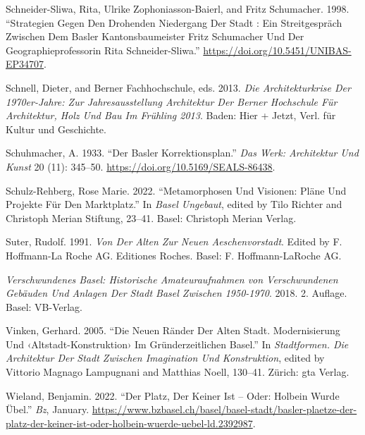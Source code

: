 \documentclass[
  letterpaper,
  DIV=11,
  numbers=noendperiod]{scrartcl}
\newlength{\cslhangindent}
\newenvironment{CSLReferences}[2] %
 {\begin{list}{}{%
  \setlength{\itemindent}{0pt}
  \setlength{\leftmargin}{0pt}
  \setlength{\parsep}{0pt}
  \ifodd #1
   \setlength{\leftmargin}{\cslhangindent}
   \setlength{\itemindent}{-1\cslhangindent}
  \fi
  \setlength{\itemsep}{#2\baselineskip}}}
 {\end{list}}
\begin{document}
\begin{CSLReferences}{1}{0}
Schneider-Sliwa, Rita, Ulrike Zophoniasson-Baierl, and Fritz Schumacher.
1998. {``Strategien Gegen Den Drohenden {Niedergang} Der {Stadt} : Ein
{Streitgespräch} Zwischen Dem {Basler} {Kantonsbaumeister} {Fritz}
{Schumacher} Und Der {Geographieprofessorin} {Rita}
{Schneider}-{Sliwa}.''} \url{https://doi.org/10.5451/UNIBAS-EP34707}.

Schnell, Dieter, and Berner Fachhochschule, eds. 2013. \emph{Die
{Architekturkrise} Der 1970er-{Jahre}: Zur {Jahresausstellung}
{Architektur} Der {Berner} {Hochschule} Für {Architektur}, {Holz} Und
{Bau} Im {Frühling} 2013}. Baden: Hier + Jetzt, Verl. für Kultur und
Geschichte.

Schuhmacher, A. 1933. {``Der {Basler} {Korrektionsplan}.''} \emph{Das
Werk: Architektur Und Kunst} 20 (11): 345--50.
\url{https://doi.org/10.5169/SEALS-86438}.

Schulz-Rehberg, Rose Marie. 2022. {``Metamorphosen Und {Visionen}:
{Pläne} Und {Projekte} Für Den {Marktplatz}.''} In \emph{Basel
Ungebaut}, edited by Tilo Richter and Christoph Merian Stiftung, 23--41.
Basel: Christoph Merian Verlag.

Suter, Rudolf. 1991. \emph{Von Der Alten Zur Neuen {Aeschenvorstadt}}.
Edited by F. Hoffmann-La Roche AG. Editiones {Roches}. Basel: F.
Hoffmann-LaRoche AG.

\emph{Verschwundenes {Basel}: Historische {Amateuraufnahmen} von
Verschwundenen {Gebäuden} Und {Anlagen} Der {Stadt} {Basel} Zwischen
1950-1970}. 2018. 2. Auflage. Basel: VB-Verlag.

Vinken, Gerhard. 2005. {``Die Neuen {Ränder} Der Alten {Stadt}.
{Modernisierung} Und ‹{Altstadt}-{Konstruktion}› Im Gründerzeitlichen
{Basel}.''} In \emph{Stadtformen. {Die} {Architektur} Der {Stadt}
Zwischen {Imagination} Und {Konstruktion}}, edited by Vittorio Magnago
Lampugnani and Matthias Noell, 130--41. Zürich: gta Verlag.

Wieland, Benjamin. 2022. {``Der {Platz}, Der Keiner Ist -- Oder:
{Holbein} Wurde Übel.''} \emph{Bz}, January.
\url{https://www.bzbasel.ch/basel/basel-stadt/basler-plaetze-der-platz-der-keiner-ist-oder-holbein-wuerde-uebel-ld.2392987}.


\end{CSLReferences}
\end{document}
